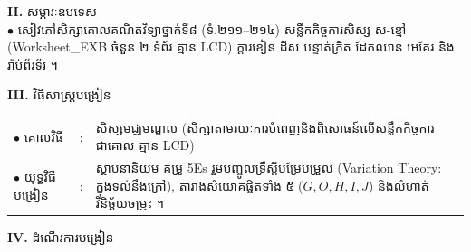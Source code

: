 \documentclass[a4paper,10pt]{article}
\newcommand{\en}[1]{{\TimesEn #1}}
\begin{document}
{\vspace{2pt}

\textbf{II.} {\muol សម្ភារៈឧបទេស}\\[1pt]
\hspace*{0.55cm}$\bullet$ \hspace{0.35cm} សៀវភៅសិក្សាគោលគណិតវិទ្យាថ្នាក់ទី៨ (ទំ.២១១--២១៤) សន្លឹកកិច្ចការសិស្ស ស-ខ្មៅ (\en{Worksheet\_EXB} ចំនួន ២ ទំព័រ គ្មាន \en{LCD}) ក្ដារខៀន ដីស បន្ទាត់ក្រិត ដែកឈាន អេគែរ និងរ៉ាប់ព័រទ័រ ។

\vspace{2pt}

\textbf{III.} {\muol វិធីសាស្រ្តបង្រៀន}\\[1pt]
\hspace*{0.45cm}%
\begin{tabular}{@{}l l L{14.85cm}@{}}
  $\bullet$ \hspace{0.25cm} គោលវិធី & : & សិស្សមជ្ឈមណ្ឌល (សិក្សាតាមរយៈការបំពេញនិងពិសោធន៍លើសន្លឹកកិច្ចការជាគោល គ្មាន \en{LCD}) \\
  $\bullet$ \hspace{0.25cm} យុទ្ធវិធីបង្រៀន & : & ស្ថាបនានិយម គម្រូ \en{5Es} រួមបញ្ចូលទ្រឹស្ដីបម្រែបម្រួល (\en{Variation Theory}: ក្នុងទល់នឹងក្រៅ), តារាងសំយោគផ្ចិតទាំង ៥ ($G,O,H,I,J$) និងលំហាត់វិនិច្ឆ័យចម្រុះ ។ \\
\end{tabular}
}

\vspace{2pt}

\textbf{IV.} {\muol ដំណើរការបង្រៀន}

\vspace{1pt}
\end{document}
